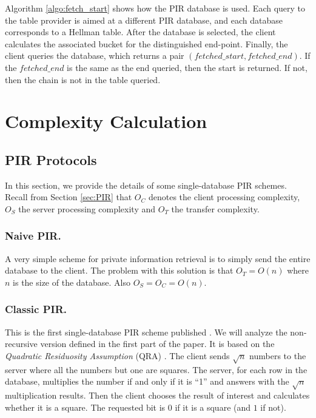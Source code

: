 \documentclass{llncs}
\begin{document}
Algorithm \ref{algo:fetch_start} shows how the PIR database is used. Each query
to the table provider is aimed at a different PIR database,
and each database corresponds to a Hellman table. 
After the database is selected, the client calculates the associated
bucket for the distinguished end-point. Finally, the client queries the database, which
returns a pair $(fetched\_start, fetched\_end)$. If the $fetched\_end$ is
the same as the end queried, then the start is returned. If not, then the chain
is not in the table queried.



\section{Complexity Calculation} \label{sec:complexity}

\subsection{PIR Protocols} \label{sec:PIR-details}

In this section, we provide the details of some single-database PIR schemes.
Recall from Section \ref{sec:PIR} that 
$O_{C}$ denotes the client processing complexity,
$O_{S}$ the server processing complexity and 
$O_{T}$ the transfer complexity.


\subsubsection{Naive PIR.}

A very simple scheme for private information retrieval is to simply
send the entire database to the client. The problem with this solution
is that $O_{T}=O(n)$ where $n$ is the size of the database. Also
$O_{S}=O_{C}=O(n)$.


\subsubsection{Classic PIR.}

This is the first single-database PIR
scheme published \cite{paper:pir_classic}. We will analyze the non-recursive
version defined in the first part of the paper. It is based on the
\emph{Quadratic Residuosity Assumption} (QRA) \cite{paper:bbs-86,paper:bc-86,paper:bdmp-91,paper:gm-84}.
The client sends $\sqrt{n}$ numbers to the server where all the
numbers but one are squares. The server, for each row in the database,
multiplies the number if and only if it is ``1'' and
answers with the $\sqrt{n}$ multiplication results. Then the client
chooses the result of interest and calculates whether it is a square.
The requested bit is $0$ if it is a square (and $1$ if not).
\end{document}
